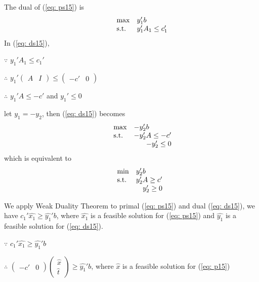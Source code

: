 The dual of (\ref{eq: ps15}) is
\begin{equation}
\label{eq: ds15}
  \begin{array}{lrcll}
    \max
    & \multicolumn{4}{l}{y_{1}'b} \\
    \text{s.t.}
    & y_{1}'A_{1}\leq c_{1}'
  \end{array}
\end{equation}
In (\ref{eq: ds15}), 

$\because$ $y_{1}'A_{1}\leq c_{1}'$

$\therefore$ $y_{1}' \left( \begin{array}{cc} A & I \end{array}\right) \leq \left( \begin{array}{cc} -c' & 0 \end{array}\right)$

$\therefore$ $y_{1}'A\leq -c'$ and $y_{1}' \leq 0$

let $y_{1}=-y_{2}$, then (\ref{eq: ds15}) becomes
\begin{equation}
\label{eq: ds115}
  \begin{array}{lrcll}
    \max
    & \multicolumn{4}{l}{-y_{2}'b} \\
    \text{s.t.}
    & -y_{2}'A\leq -c'\\
    & -y_{2}'\leq 0
  \end{array}
\end{equation}
which is equivalent to
\begin{equation}
\label{eq: ds215}
  \begin{array}{lrcll}
    \min
    & \multicolumn{4}{l}{y_{2}'b} \\
    \text{s.t.}
    & y_{2}'A\geq c'\\
    & y_{2}'\geq 0
  \end{array}
\end{equation}

We apply Weak Duality Theorem to primal (\ref{eq: ps15}) and dual (\ref{eq: ds15}), we have $c_{1}'\widehat{x_{1}} \geq \widehat{y_{1}}'b$, where $\widehat{x_{1}}$ is a feasible solution for (\ref{eq: ps15}) and $\widehat{y_{1}}$ is a feasible solution for (\ref{eq: ds15}).

$\because$  $c_{1}'\widehat{x_{1}} \geq \widehat{y_{1}}'b$

$\therefore$ $ \left( \begin{array}{cc} -c' & 0 \end{array}\right)  \left( \begin{array}{c} \widehat{x} \\ \widehat{t} \end{array}\right) \geq \widehat{y_{1}}'b$, where $\widehat{x}$ is a feasible solution for (\ref{eq: p15})

